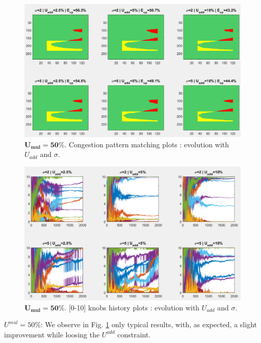 \begin{figure}[!h]
	\label{fig:umulcp50}
	\caption{$\mathbf{U_{mul}=50\%}$. Congestion pattern matching plots : evolution with $U_{add}$ and $\sigma$.}
	\includegraphics[width=7in]{figures/results_figures/Umul/cp_Umul_50_lambda_11.png}
\end{figure}
\begin{figure}[!h]
	\label{fig:umulknobs50}
	\caption{$\mathbf{U_{mul}=50\%}$. [0-10] knobs history plots : evolution with $U_{add}$ and $\sigma$.}
	\includegraphics[width=7in]{figures/results_figures/Umul/knobs_Umul_50_lambda_11.png}
\end{figure}	
\emph{$U^{mul}=50\% $}: We observe in Fig. \ref{fig:umulcp50} only typical results, with, as expected, a slight improvement while loosing the $U^{add}$ constraint.

